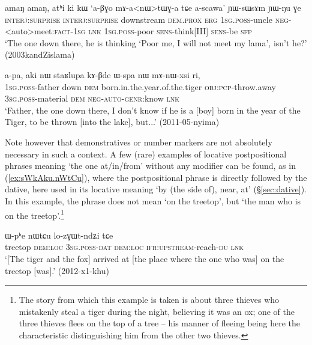\begin{exe}
\ex \label{ex:athi.ki}
\gll amaŋ amaŋ, atʰi ki kɯ `a-βɣo mɤ-a<nɯ>tɯɣ-a tɕe a-scawa' ɲɯ-sɯsɤm ɲɯ-ŋu ɣe \\
\textsc{interj}:\textsc{surprise} \textsc{interj}:\textsc{surprise}  downstream \textsc{dem}.\textsc{prox} \textsc{erg} \textsc{1sg}.\textsc{poss}-uncle \textsc{neg}-<auto>meet:\textsc{fact}-\textsc{1sg} \textsc{lnk} \textsc{1sg}.\textsc{poss}-poor \textsc{sens}-think[III] \textsc{sens}-be \textsc{sfp} \\
\glt `The one down there, he is thinking `Poor me, I will not meet my lama', isn't he?' (2003kandZislama)
\end{exe}

\begin{exe}
\ex \label{ex:aki.nW}
\gll a-pa, aki nɯ staʁlupa kɤ-βde ɯ-spa nɯ mɤ-nɯ-xsi ri, \\
\textsc{1sg}.\textsc{poss}-father down \textsc{dem} born.in.the.year.of.the.tiger \textsc{obj}:\textsc{pcp}-throw.away \textsc{3sg}.\textsc{poss}-material \textsc{dem} \textsc{neg}-\textsc{auto}-\textsc{genr}:know \textsc{lnk} \\
\glt `Father, the one down there, I don't know if he is a [boy] born in the year of the Tiger, to be thrown [into the lake], but...' (2011-05-nyima)
\end{exe}


Note however that demonstratives or number markers are not absolutely necessary in such a context. A few (rare) examples of locative postpositional phrases meaning `the one at/in/from' without any modifier can be found, as in (\ref{ex:sWkAku.nWtCu}), where the postpositional phrase is directly followed by the dative, here used in its locative meaning `by (the side of), near, at' (§\ref{sec:dative}). In this example, the phrase  does not mean `on the treetop', but `the man who is on the treetop'.\footnote{The story from which this example is taken is about three thieves who mistakenly steal a tiger during the night, believing it was an ox; one of the three thieves flees on the top of a tree -- his manner of fleeing being here the characteristic distinguishing him from the other two thieves.}

\begin{exe}
\ex \label{ex:sWkAku.nWtCu}
 ɯ-pʰe nɯtɕu lo-zɣɯt-ndʑi tɕe\\
treetop \textsc{dem}:\textsc{loc} \textsc{3sg}.\textsc{poss}-\textsc{dat} \textsc{dem}:\textsc{loc}  \textsc{ifr}:\textsc{upstream}-reach-\textsc{du} \textsc{lnk}\\
\glt `[The tiger and the fox] arrived at [the place where the one who was] on the treetop [was].' (2012-x1-khu)
\end{exe}

